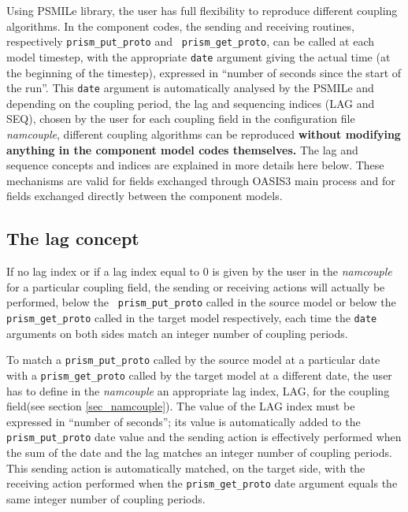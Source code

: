 Using PSMILe library, the user has full flexibility to reproduce
different coupling algorithms. In the component codes, the sending and
receiving routines, respectively {\tt prism\_put\_proto} and {\tt
  prism\_get\_proto}, can be called at each model timestep, with the
appropriate {\tt date} argument giving the actual time (at the
beginning of the timestep), expressed in ``number of seconds since the
start of the run''. This {\tt date} argument is automatically analysed
by the PSMILe
and depending on the coupling period, the
lag and sequencing indices (LAG and SEQ), chosen by the user for each
coupling field in the configuration file {\it namcouple}, different
coupling algorithms can be reproduced {\bf without modifying anything in the
component model codes themselves.}  The lag and sequence concepts and
indices are explained in more details here below. These mechanisms
are valid for fields exchanged through OASIS3 main
process and for fields exchanged directly between the component
models.

\subsection{The lag concept}
\label{subsub_lag}

If no lag index or if a lag index equal to 0 is given by the user in
the {\it namcouple} for a particular coupling field, the sending or
receiving actions will actually be performed, below the {\tt
  prism\_put\_proto} called in the source model or below the {\tt
  prism\_get\_proto} called in the target model respectively, each time the
{\tt date} arguments on both sides match an integer number of
coupling periods.
 
\vspace*{0.5cm}

To match a {\tt prism\_put\_proto} called by the source model at a
particular date with a {\tt prism\_get\_proto} called by the target
model at a different date, the user has to define in the {\it
namcouple} an appropriate lag index, LAG, for the coupling field(see
section \ref{sec_namcouple}). The value of the LAG index must be
expressed in ``number of seconds''; its value is automatically added
to the {\tt prism\_put\_proto} date value and the sending action is
effectively performed when the sum of the date and the lag matches an
integer number of coupling periods. This sending action is
automatically matched, on the target side, with the receiving action
performed when the {\tt prism\_get\_proto} date argument equals the
same integer number of coupling periods.
 
